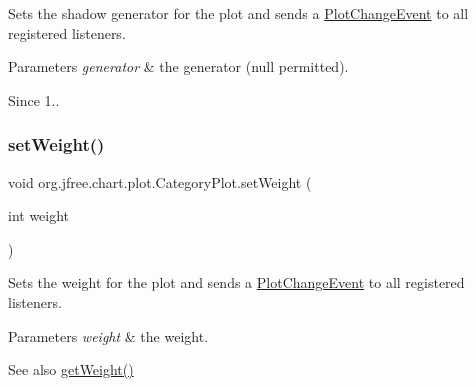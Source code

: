 Sets the shadow generator for the plot and sends a \mbox{\hyperlink{}{Plot\+Change\+Event}} to all registered listeners.


\begin{DoxyParams}{Parameters}
{\em generator} & the generator ({\ttfamily null} permitted).\\
\hline
\end{DoxyParams}
\begin{DoxySince}{Since}
1.. 
\end{DoxySince}
\mbox{\label{classorg_1_1jfree_1_1chart_1_1plot_1_1_category_plot_a1a21197688cb44c6e9e477735f2dddc2}} 
\subsubsection{\texorpdfstring{set\+Weight()}{setWeight()}}
{\footnotesize\ttfamily void org.\+jfree.\+chart.\+plot.\+Category\+Plot.\+set\+Weight (\begin{DoxyParamCaption}\item[{int}]{weight }\end{DoxyParamCaption})}

Sets the weight for the plot and sends a \mbox{\hyperlink{}{Plot\+Change\+Event}} to all registered listeners.


\begin{DoxyParams}{Parameters}
{\em weight} & the weight.\\
\hline
\end{DoxyParams}
\begin{DoxySeeAlso}{See also}
\mbox{\hyperlink{classorg_1_1jfree_1_1chart_1_1plot_1_1_category_plot_ad53da6d191b15b1c86d02b9be5de2adf}{get\+Weight()}} 
\end{DoxySeeAlso}
\mbox{\label{classorg_1_1jfree_1_1chart_1_1plot_1_1_category_plot_a0d3da3ceff2de768f55d5fbc626c1c46}} 
